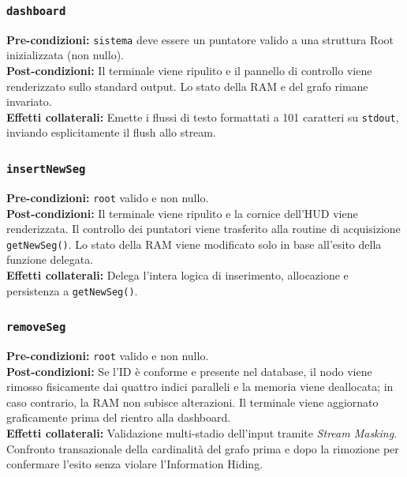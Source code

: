 \documentclass[12pt, a4paper]{article}
\begin{document}
\subsubsection{\texttt{dashboard}}
\vspace{3mm}
\begin{specbox}
\textbf{Pre-condizioni:} \texttt{sistema} deve essere un puntatore valido a una struttura Root inizializzata (non nullo). \\
\textbf{Post-condizioni:} Il terminale viene ripulito e il pannello di controllo viene renderizzato sullo standard output. Lo stato della RAM e del grafo rimane invariato. \\
\textbf{Effetti collaterali:} Emette i flussi di testo formattati a 101 caratteri su \texttt{stdout}, inviando esplicitamente il flush allo stream.
\end{specbox}

\subsubsection{\texttt{insertNewSeg}}
\vspace{3mm}
\begin{specbox}
\textbf{Pre-condizioni:} \texttt{root} valido e non nullo. \\
\textbf{Post-condizioni:} Il terminale viene ripulito e la cornice dell'HUD viene renderizzata. Il controllo dei puntatori viene trasferito alla routine di acquisizione \texttt{getNewSeg()}. Lo stato della RAM viene modificato solo in base all'esito della funzione delegata. \\
\textbf{Effetti collaterali:} Delega l'intera logica di inserimento, allocazione e persistenza a \texttt{getNewSeg()}.
\end{specbox}

\subsubsection{\texttt{removeSeg}}
\vspace{3mm}
\begin{specbox}
\textbf{Pre-condizioni:} \texttt{root} valido e non nullo. \\
\textbf{Post-condizioni:} Se l'ID è conforme e presente nel database, il nodo viene rimosso fisicamente dai quattro indici paralleli e la memoria viene deallocata; in caso contrario, la RAM non subisce alterazioni. Il terminale viene aggiornato graficamente prima del rientro alla dashboard. \\
\textbf{Effetti collaterali:} Validazione multi-stadio dell'input tramite \textit{Stream Masking}. Confronto transazionale della cardinalità del grafo prima e dopo la rimozione per confermare l'esito senza violare l'Information Hiding.
\end{specbox}
\end{document}
